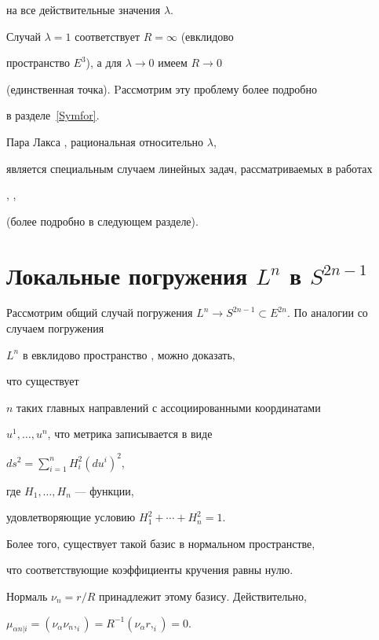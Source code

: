  на все действительные значения $\lambda$.


Случай $\lambda=1$ соответствует $R=\infty$ (евклидово


пространство $E^{3}$), а для $\lambda \rightarrow 0$ имеем $R \rightarrow 0$


(единственная точка). Pассмотрим эту проблему более подробно


в разделе~\ref{Symfor}.





Пара Лакса , рациональная относительно $\lambda$,


является специальным случаем линейных задач, рассматриваемых в работах


\cite{ABT}, \cite{FP}, \cite{Ci-space}


(более подробно в следующем разделе).








\section{Локальные погружения $L^n$ в $S^{2n-1}$} \label{Ln}





Рассмотрим общий случай погружения $L^n \rightarrow S^{2n-1}


\subset E^{2n}$. По аналогии со случаем погружения


$L^n$ в евклидово пространство \cite{Am77}, \cite{Mo} можно доказать,


что существует


$n$ таких главных направлений с ассоциированными координатами 


$u^1,\dotsc,u^n$, что метрика записывается в виде


$ds^2 = \sum\limits_{i=1}^n H_i^2 (du^i)^2$, 


где $H_1,\dotsc,H_n$ --- функции,


удовлетворяющие условию $H_1^2+\dotsb+H_n^2=1$.


Более того, существует такой базис в нормальном пространстве,


что соответствующие коэффициенты кручения равны нулю.


Нормаль $\nu_n=r/R$ принадлежит этому базису. Действительно,


$\mu_{\alpha n|i} = (\nu_\alpha \nu_n,_i) = R^{-1} (\nu_\alpha r,_i )= 0$.


